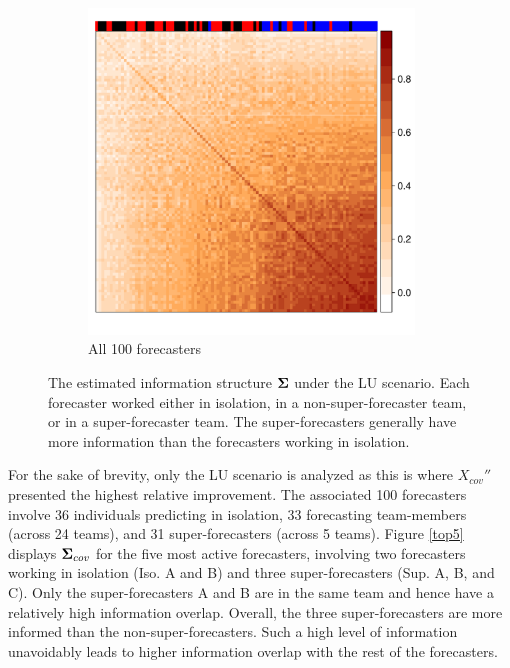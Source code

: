 \documentclass[11pt]{article}
\theoremstyle{definition}
\theoremstyle{definition}
\def\bSigma{{\bf \Sigma}}
\begin{document}
\begin{figure}[t!]
\begin{subfigure}[b]{0.495\textwidth}
                \includegraphics[width=0.95\textwidth]{rightInfoPlot.pdf}
            \caption{All 100 forecasters}
                                \label{top100}
        \end{subfigure}

       
        \caption{The estimated information structure $\bSigma$ under the LU scenario. Each forecaster worked either in isolation, in a non-super-forecaster team, or in a super-forecaster team. The super-forecasters generally have more information than the forecasters working in isolation.}
        \label{SynthPlot}
\end{figure}


For the sake of brevity, only the LU scenario is analyzed as this is where $X_{cov}''$ presented the highest relative improvement. 
The associated 100 forecasters involve 36 individuals predicting in isolation, 33 forecasting team-members (across 24 teams), and 31 super-forecasters (across 5 teams).  Figure \ref{top5} displays $\bSigma_{cov}$ for the five most active forecasters, involving two forecasters working in isolation (Iso. A and B) and three super-forecasters (Sup. A, B, and C). Only the super-forecasters A and B are in the same team and hence have a relatively high information overlap. Overall, the three super-forecasters are more informed than the non-super-forecasters. Such a high level of information unavoidably leads to higher information overlap with the rest of the forecasters. 
\end{document}
